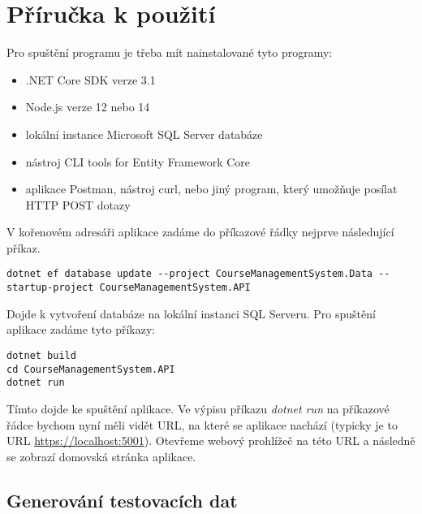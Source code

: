 \section{Příručka k použití}
Pro spuštění programu je třeba mít nainstalované tyto programy:
\begin{itemize}
	\item .NET Core SDK verze 3.1
	\item Node.js verze 12 nebo 14
	\item lokální instance Microsoft SQL Server databáze
	\item nástroj CLI tools for Entity Framework Core
	\item aplikace Postman, nástroj curl, nebo jiný program, který umožňuje posílat HTTP POST dotazy
\end{itemize}

V kořenovém adresáři aplikace zadáme do příkazové řádky nejprve následující příkaz.

\begin{lstlisting}
dotnet ef database update --project CourseManagementSystem.Data --startup-project CourseManagementSystem.API
\end{lstlisting}

Dojde k vytvoření databáze na lokální instanci SQL Serveru.
Pro spuštění aplikace zadáme tyto příkazy:
\begin{lstlisting}
dotnet build
cd CourseManagementSystem.API
dotnet run
\end{lstlisting}

Tímto dojde ke spuštění aplikace. Ve výpisu příkazu \textit{dotnet run} na příkazové řádce bychom nyní měli vidět URL, na které se aplikace nachází (typicky je to URL \url{https://localhost:5001}). Otevřeme webový prohlížeč na této URL a následně se zobrazí domovská stránka aplikace.

\subsection{Generování testovacích dat}

